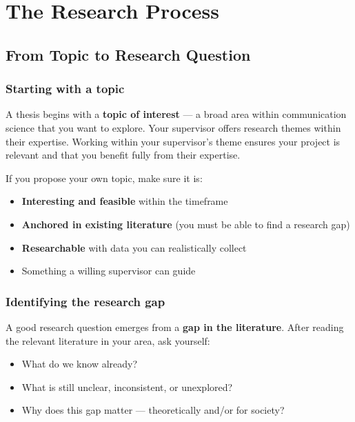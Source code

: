 \documentclass[
  11pt,
  a4paper,
]{scrbook}
\providecommand{\tightlist}{%
  \setlength{\itemsep}{0pt}\setlength{\parskip}{0pt}}\usepackage{longtable,booktabs,array}
\begin{document}
\part{The Research Process}

\chapter{From Topic to Research
Question}\label{from-topic-to-research-question}

\section{Starting with a topic}\label{starting-with-a-topic}

A thesis begins with a \textbf{topic of interest} --- a broad area
within communication science that you want to explore. Your supervisor
offers research themes within their expertise. Working within your
supervisor's theme ensures your project is relevant and that you benefit
fully from their expertise.

If you propose your own topic, make sure it is:

\begin{itemize}
\tightlist
\item
  \textbf{Interesting and feasible} within the timeframe
\item
  \textbf{Anchored in existing literature} (you must be able to find a
  research gap)
\item
  \textbf{Researchable} with data you can realistically collect
\item
  Something a willing supervisor can guide
\end{itemize}

\section{Identifying the research
gap}\label{identifying-the-research-gap}

A good research question emerges from a \textbf{gap in the literature}.
After reading the relevant literature in your area, ask yourself:

\begin{itemize}
\tightlist
\item
  What do we know already?
\item
  What is still unclear, inconsistent, or unexplored?
\item
  Why does this gap matter --- theoretically and/or for society?
\end{itemize}
\end{document}

